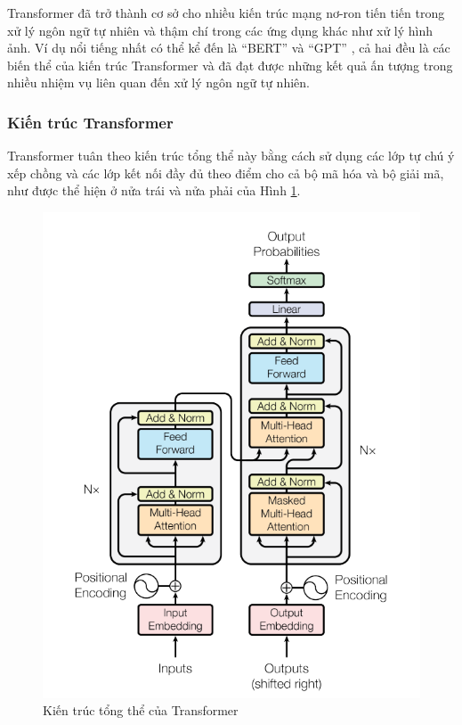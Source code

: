 Transformer đã trở thành cơ sở cho nhiều kiến trúc mạng nơ-ron tiến tiến trong xử lý ngôn ngữ tự nhiên và thậm chí trong các ứng dụng khác như xử lý hình ảnh. Ví dụ nổi tiếng nhất có thể kể đến là ``BERT'' và ``GPT'' , cả hai đều là các biến thể của kiến trúc Transformer và đã đạt được những kết quả ấn tượng trong nhiều nhiệm vụ liên quan đến xử lý ngôn ngữ tự nhiên.

\subsubsection*{Kiến trúc Transformer}
Transformer tuân theo kiến trúc tổng thể này bằng cách sử dụng các lớp tự chú ý xếp chồng và các lớp kết nối đầy đủ theo điểm cho cả bộ mã hóa và bộ giải mã, như được thể hiện ở nửa trái và nửa phải của Hình \ref{fig3}. 
\begin{figure}[h]
    \includegraphics[scale=0.65]{chapter2/images/transformer-architecture.png}
    \centering
    \caption{Kiến trúc tổng thể của Transformer \cite{vaswani2023attention}}
    \label{fig3}
\end{figure}

